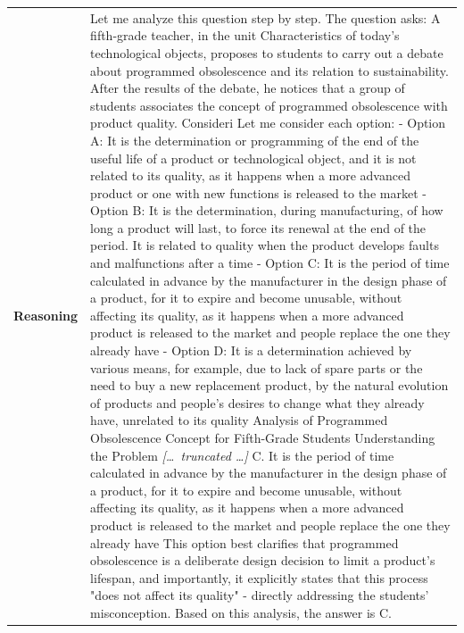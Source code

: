 \begin{longtable}{@{}l p{13cm}@{}}
  \textbf{Reasoning} & Let me analyze this question step by step. \newline The question asks: A fifth-grade teacher, in the unit Characteristics of today's technological objects, proposes to students to carry out a debate about programmed obsolescence and its relation to sustainability. After the results of the debate, he notices that a group of students associates the concept of programmed obsolescence with product quality. Consideri \newline Let me consider each option: \newline - Option A: It is the determination or programming of the end of the useful life of a product or technological object, and it is not related to its quality, as it happens when a more advanced product or one with new functions is released to the market \newline - Option B: It is the determination, during manufacturing, of how long a product will last, to force its renewal at the end of the period. It is related to quality when the product develops faults and malfunctions after a time \newline - Option C: It is the period of time calculated in advance by the manufacturer in the design phase of a product, for it to expire and become unusable, without affecting its quality, as it happens when a more advanced product is released to the market and people replace the one they already have \newline - Option D: It is a determination achieved by various means, for example, due to lack of spare parts or the need to buy a new replacement product, by the natural evolution of products and people's desires to change what they already have, unrelated to its quality \newline Analysis of Programmed Obsolescence Concept for Fifth-Grade Students \newline Understanding the Problem \newline \textit{[\ldots\ truncated \ldots]} \newline C. It is the period of time calculated in advance by the manufacturer in the design phase of a product, for it to expire and become unusable, without affecting its quality, as it happens when a more advanced product is released to the market and people replace the one they already have \newline This option best clarifies that programmed obsolescence is a deliberate design decision to limit a product's lifespan, and importantly, it explicitly states that this process "does not affect its quality" - directly addressing the students' misconception. \newline Based on this analysis, the answer is C.  \\

\end{longtable}
